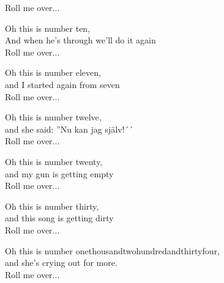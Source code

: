 Roll me over...\par
\vspace{10pt}
Oh this is number ten,\\
And when he's through we'll do it again\\
Roll me over...\par
\vspace{10pt}
Oh this is number eleven,\\
and I started again from seven\\
Roll me over...\par
\vspace{10pt}
Oh this is number twelve,\\
and she said: ''Nu kan jag själv!´´\\
Roll me over...\par
\vspace{10pt}
Oh this is number twenty,\\
and my gun is getting empty\\
Roll me over...\par
\vspace{10pt}
Oh this is number thirty,\\
and this song is getting dirty\\
Roll me over...\par
\vspace{10pt}
Oh this is number onethousandtwohundredandthirtyfour,\\
and she's crying out for more.\\
Roll me over...
